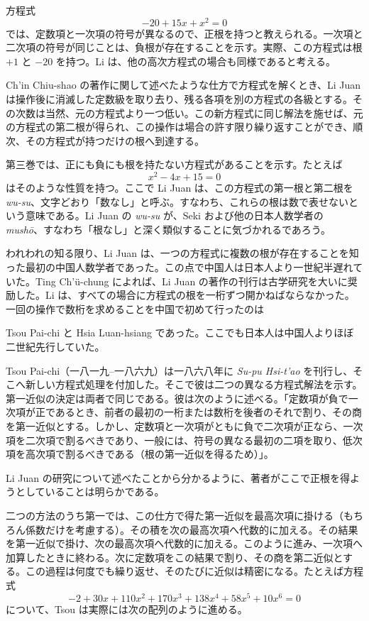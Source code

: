 \documentclass[11pt]{article}
\newcommand{\scanpage}[2]{\clearpage\setcounter{footnote}{0}\noindent{\footnotesize\color{gray}PDF #1 頁 · #2}\par\medskip}
\newcommand{\scanfooter}{}
\begin{document}
方程式
\[
-20+15x+x^2=0
\]
では、定数項と一次項の符号が異なるので、正根を持つと教えられる。一次項と二次項の符号が同じことは、負根が存在することを示す。実際、この方程式は根 $+1$ と $-20$ を持つ。Li は、他の高次方程式の場合も同様であると考える。

Ch'in Chiu-shao の著作に関して述べたような仕方で方程式を解くとき、Li Juan は操作後に消滅した定数級を取り去り、残る各項を別の方程式の各級とする。その次数は当然、元の方程式より一つ低い。この新方程式に同じ解法を施せば、元の方程式の第二根が得られ、この操作は場合の許す限り繰り返すことができ、順次、その方程式が持つだけの根へ到達する。

第三巻では、正にも負にも根を持たない方程式があることを示す。たとえば
\[
x^2-4x+15=0
\]
はそのような性質を持つ。ここで Li Juan は、この方程式の第一根と第二根を \emph{wu-su}、文字どおり「数なし」と呼ぶ。すなわち、これらの根は数で表せないという意味である。Li Juan の \emph{wu-su} が、Seki および他の日本人数学者の \emph{mushō}、すなわち「根なし」と深く類似することに気づかれるであろう。

われわれの知る限り、Li Juan は、一つの方程式に複数の根が存在することを知った最初の中国人数学者であった。この点で中国人は日本人より一世紀半遅れていた。Ting Ch'ü-chung によれば、Li Juan の著作の刊行は古学研究を大いに奨励した。Li は、すべての場合に方程式の根を一桁ずつ開かねばならなかった。一回の操作で数桁を求めることを中国で初めて行ったのは
\scanfooter

\scanpage{0144}{第19章、印刷頁130}
Tsou Pai-chi と Hsia Luan-hsiang であった。ここでも日本人は中国人よりほぼ二世紀先行していた。

Tsou Pai-chi（一八一九--一八六九）は一八六八年に \emph{Su-pu Hsi-t'ao} を刊行し、そこへ新しい方程式処理を付加した。そこで彼は二つの異なる方程式解法を示す。第一近似の決定は両者で同じである。彼は次のように述べる。「定数項が負で一次項が正であるとき、前者の最初の一桁または数桁を後者のそれで割り、その商を第一近似とする。しかし、定数項と一次項がともに負で二次項が正なら、一次項を二次項で割るべきであり、一般には、符号の異なる最初の二項を取り、低次項を高次項で割るべきである（根の第一近似を得るため）」。

Li Juan の研究について述べたことから分かるように、著者がここで正根を得ようとしていることは明らかである。

二つの方法のうち第一では、この仕方で得た第一近似を最高次項に掛ける（もちろん係数だけを考慮する）。その積を次の最高次項へ代数的に加える。その結果を第一近似で掛け、次の最高次項へ代数的に加える。このように進み、一次項へ加算したときに終わる。次に定数項をこの結果で割り、その商を第二近似とする。この過程は何度でも繰り返せ、そのたびに近似は精密になる。たとえば方程式
\[
-2+30x+110x^2+170x^3+138x^4+58x^5+10x^6=0
\]
について、Tsou は実際には次の配列のように進める。
\end{document}
